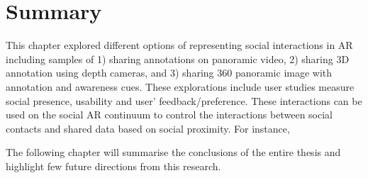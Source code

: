 \section{Summary}

This chapter explored different options of representing social interactions in AR including samples of 1) sharing annotations on panoramic video, 2) sharing 3D annotation using depth cameras, and 3) sharing 360 panoramic image with annotation and awareness cues. These explorations include user studies measure social presence, usability and user' feedback/preference. These interactions can be used on the social AR continuum to control the interactions between social contacts and shared data based on social proximity. For instance,  

The following chapter will summarise the conclusions of the entire thesis and highlight few future directions from this research.

